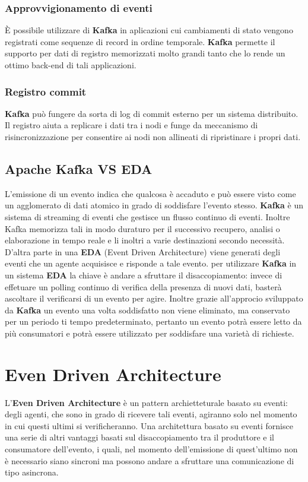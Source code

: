 \documentclass{article}
\begin{document}
\subsubsection{Approvvigionamento di eventi}
È possibile utilizzare  di \textbf{Kafka} in aplicazioni cui cambiamenti di stato vengono registrati come sequenze di record in ordine temporale. \textbf{Kafka} permette il supporto per dati di registro memorizzati molto grandi tanto che lo rende un ottimo back-end di tali applicazioni. 
\subsubsection{Registro commit}
\textbf{Kafka} può fungere da sorta di log di commit esterno per un sistema distribuito. Il registro aiuta a replicare i dati tra i nodi e funge da meccanismo di risincronizzazione per consentire ai nodi non allineati di ripristinare i propri dati.

\subsection{Apache Kafka VS EDA}
L'emissione di un evento indica che qualcosa è accaduto e può essere visto come un agglomerato di dati atomico in grado di soddisfare l'evento stesso. 
\textbf{Kafka} è un sistema di streaming di eventi che gestisce un flusso continuo di eventi. Inoltre Kafka memorizza tali in modo duraturo per il successivo recupero, analisi o elaborazione in tempo reale e li inoltri a varie destinazioni secondo necessità.
\\
D'altra parte in una \textbf{EDA} (Event Driven Architecture) viene generati degli eventi che un agente acquisisce e risponde a tale evento.
per utilizzare \textbf{Kafka} in un sistema \textbf{EDA} la chiave è andare a sfruttare il disaccopiamento: invece di effetuare un polling continuo di verifica della presenza di nuovi dati, basterà ascoltare il verificarsi di un evento per agire. Inoltre grazie all'approcio sviluppato da \textbf{Kafka} un evento una volta soddisfatto non viene eliminato, ma conservato per un periodo ti tempo predeterminato, pertanto un evento potrà essere letto da più consumatori e potrà essere utilizzato per soddisfare una varietà di richieste.
\section{Even Driven Architecture}
L'\textbf{Even Driven Architecture} è un pattern archietteturale basato su eventi: degli agenti, che sono in grado di ricevere tali eventi, agiranno solo nel momento in cui questi ultimi si verificheranno. 
Una architettura basato su eventi fornisce una serie di altri vantaggi basati sul disaccopiamento tra il produttore e il consumatore dell'evento, i quali, nel momento dell'emissione di quest'ultimo non è necessario siano sincroni ma possono andare a sfruttare una comunicazione di tipo asincrona. 
\end{document}
